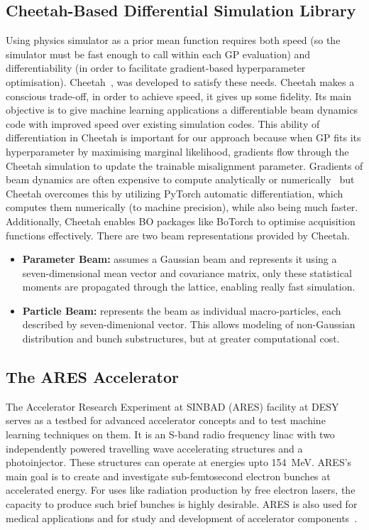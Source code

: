 \subsection{Cheetah-Based Differential Simulation Library}

Using physics simulator as a prior mean function requires both speed (so the simulator must be fast enough to call within each GP evaluation) and differentiability (in order to facilitate gradient-based 
hyperparameter optimisation). Cheetah~\cite{kaiser2024bridging}, was developed to satisfy these needs. Cheetah makes a conscious trade-off, in order to achieve speed, it gives up some fidelity. 
Its main objective is to give machine learning applications a differentiable beam dynamics code with improved speed over existing simulation codes.
This ability of differentiation in Cheetah is important for our approach because when GP fits its hyperparameter by maximising marginal likelihood, gradients flow through the Cheetah simulation to update the trainable misalignment parameter. 
Gradients of beam dynamics are often expensive to compute analytically or numerically~\cite{kaiser2024bridging} 
but Cheetah overcomes this by utilizing PyTorch automatic differentiation, which computes them numerically (to machine precision), while also being much faster.
Additionally, Cheetah enables BO packages like BoTorch to optimise acquisition functions effectively. There are two beam representations provided by Cheetah. 


\begin{itemize}
    \item \textbf{Parameter Beam:} assumes a Gaussian beam and represents it using a seven-dimensional mean vector and covariance matrix, only these statistical moments are propagated through the lattice, enabling really fast simulation. 
    \item \textbf{Particle Beam:} represents the beam as individual macro-particles, each described by seven-dimenional vector. This allows modeling of non-Gaussian distribution and bunch substructures, but at greater computational cost. 
\end{itemize}


\subsection{The ARES Accelerator}

The Accelerator Research Experiment at SINBAD (ARES) facility at DESY serves as a testbed for advanced accelerator concepts and to test machine learning 
techniques on them. It is an S-band radio frequency linac with two independently powered travelling wave accelerating structures and a photoinjector. These structures can operate at energies upto \SI{154}{MeV}. 
ARES's main goal is to create and investigate sub-femtosecond electron bunches at accelerated energy. For uses like radiation production by free electron lasers, the capacity to produce such brief bunches is highly desirable. ARES is also used for medical applications and for study and development of accelerator components~\cite{kaiser2024rl}.    \

